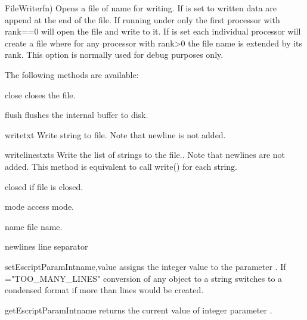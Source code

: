 \begin{classdesc}{FileWriter}{fn)}
Opens a file of name  for writing. If  is set to \True
written data are append at the end of the file.
If running under \MPI only the first processor with rank==0
will open the file and write to it. 
If  is set each individual processor will create a file
where for any processor with rank>0 the file name is extended by its rank. This option is normally used for debug purposes only.
\end{classdesc}

The following methods are available:
\begin{methoddesc}[FileWriter]{close}{}
closes the file.
\end{methoddesc}
\begin{methoddesc}[FileWriter]{flush}{}
flushes the internal buffer to disk.
\end{methoddesc}
\begin{methoddesc}[FileWriter]{write}{txt}
Write string  to file.
Note that newline is not added.
\end{methoddesc}
\begin{methoddesc}[FileWriter]{writelines}{txts}
Write the list  of strings to the file..
Note that newlines are not added. 
This method is equivalent to call write() for each string.
\end{methoddesc}
\begin{memberdesc}[FileWriter]{closed}
\True if file is closed.
\end{memberdesc}
\begin{memberdesc}[FileWriter]{mode}
access mode. 
\end{memberdesc}
\begin{memberdesc}[FileWriter]{name}
file name.
\end{memberdesc}
\begin{memberdesc}[FileWriter]{newlines}
line separator
\end{memberdesc}


\begin{funcdesc}{setEscriptParamInt}{name,value}
assigns the integer value  to the parameter .
If ="TOO_MANY_LINES" conversion of any \Data object to a string switches to a 
condensed format if more than  lines would be created.
\end{funcdesc}

\begin{funcdesc}{getEscriptParamInt}{name}
returns the current value of integer parameter . 
\end{funcdesc}

